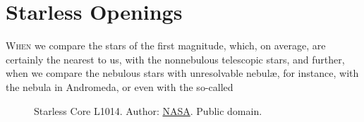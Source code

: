 \chapter{Starless Openings}

\lettrine[lines=4]{\goudy W}{hen} we compare the stars of the first magnitude, which, on average, are certainly the nearest to us, with the nonnebulous telescopic stars, and further, when we compare the nebulous stars with unresolvable nebul\ae, for instance, with the nebula in Andromeda, or even with the so-called

\begin{figure}
    \centering
    \caption{\footnotesize Starless Core L1014. Author: \href{https://commons.wikimedia.org/wiki/File:\%22Starless\%22_Core_L1014.jpg}{NASA}. Public domain.}
    \vspace{-10pt}
    \label{fig:starless-core}
\end{figure}

